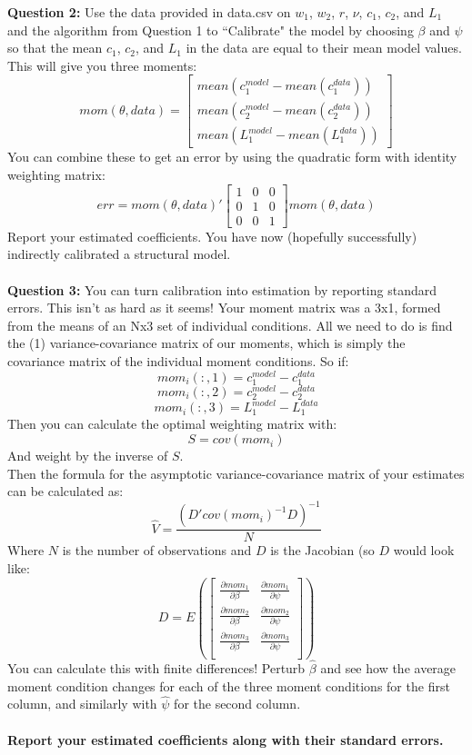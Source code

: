 \documentclass[11pt]{article}
\begin{document}
\textbf{Question 2:}  Use the data provided in data.csv on $w_1$, $w_2$, $r$, $\nu$, $c_1$, $c_2$, and $L_1$ and the algorithm from Question 1 to ``Calibrate" the model by choosing $\beta$ and $\psi$ so that the mean $c_1$, $c_2$, and $L_1$ in the data are equal to their mean model values.  This will give you three moments:
$$mom(\theta,data)=\left[\begin{array}{c}mean(c_1^{model}-mean(c_1^{data})) \\ mean(c_2^{model}-mean(c_2^{data})) \\ mean(L_1^{model}-mean(L_1^{data}))\end{array}\right]$$
You can combine these to get an error by using the quadratic form with identity weighting matrix:
$$err=mom(\theta,data)'\left[\begin{array}{ccc}1 & 0 & 0 \\ 0 & 1 & 0 \\ 0 & 0 & 1\end{array}\right]mom(\theta,data)$$
Report your estimated coefficients.  You have now (hopefully successfully) indirectly calibrated a structural model. \\
\ \\
\textbf{Question 3:}  You can turn calibration into estimation by reporting standard errors. This isn't as hard as it seems! Your moment matrix was a 3x1, formed from the means of an Nx3 set of individual conditions. All we need to do is find the (1) variance-covariance matrix of our moments, which is simply the covariance matrix of the individual moment conditions.  So if:
$$mom_i(:,1) = c_1^{model}-c_1^{data}$$
$$mom_i(:,2) = c_2^{model}-c_2^{data}$$
$$mom_i(:,3) = L_1^{model}-L_1^{data}$$
Then you can calculate the optimal weighting matrix with:
$$S=cov(mom_i)$$
And weight by the inverse of $S$.  \\
Then the formula for the asymptotic variance-covariance matrix of your estimates can be calculated as:
$$\hat{V}=\frac{\left(D'cov(mom_i)^{-1}D\right)^{-1}}{N}$$
Where $N$ is the number of observations and $D$ is the Jacobian (so $D$ would look like:
$$D=E\left(\left[\begin{array}{ccc}\frac{\partial mom_1}{\partial \beta} & \frac{\partial mom_1}{\partial \psi} \\ \frac{\partial mom_2}{\partial \beta} & \frac{\partial mom_2}{\partial \psi} \\ \frac{\partial mom_3}{\partial \beta} & \frac{\partial mom_3}{\partial \psi} \\\end{array}\right]\right)$$
You can calculate this with finite differences!  Perturb $\hat{\beta}$ and see how the average moment condition changes for each of the three moment conditions for the first column, and similarly with $\hat{\psi}$ for the second column.
\ \\
\ \\
\textbf{Report your estimated coefficients along with their standard errors.}
 \\
\ \\
\end{document}

